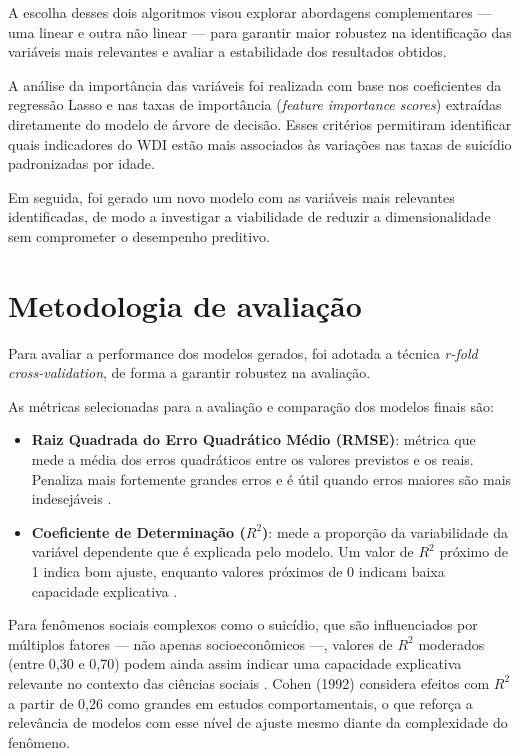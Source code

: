 \documentclass[letterpaper]{article}
\begin{document}
A escolha desses dois algoritmos visou explorar abordagens complementares — uma linear e outra não linear — para garantir maior robustez na identificação das variáveis mais relevantes e avaliar a estabilidade dos resultados obtidos.

A análise da importância das variáveis foi realizada com base nos coeficientes da regressão Lasso e nas taxas de importância (\textit{feature importance scores}) extraídas diretamente do modelo de árvore de decisão. Esses critérios permitiram identificar quais indicadores do WDI estão mais associados às variações nas taxas de suicídio padronizadas por idade.

Em seguida, foi gerado um novo modelo com as variáveis mais relevantes identificadas, de modo a investigar a viabilidade de reduzir a dimensionalidade sem comprometer o desempenho preditivo.

\section{Metodologia de avaliação} %
Para avaliar a performance dos modelos gerados, foi adotada a técnica \textit{r-fold cross-validation}, de forma a garantir robustez na avaliação.

As métricas selecionadas para a avaliação e comparação dos modelos finais são:

\begin{itemize}
    \item \textbf{Raiz Quadrada do Erro Quadrático Médio (RMSE)}: métrica que mede a média dos erros quadráticos entre os valores previstos e os reais. Penaliza mais fortemente grandes erros e é útil quando erros maiores são mais indesejáveis \cite{chai2014rmse}.
    \item \textbf{Coeficiente de Determinação ($R^2$)}: mede a proporção da variabilidade da variável dependente que é explicada pelo modelo. Um valor de $R^2$ próximo de 1 indica bom ajuste, enquanto valores próximos de 0 indicam baixa capacidade explicativa \cite{frost2019r2}.
\end{itemize}

Para fenômenos sociais complexos como o suicídio, que são influenciados por múltiplos fatores — não apenas socioeconômicos —, valores de $R^2$ moderados (entre 0{,}30 e 0{,}70) podem ainda assim indicar uma capacidade explicativa relevante no contexto das ciências sociais \cite{soc_r2_interpretation}. Cohen (1992) considera efeitos com $R^2$ a partir de 0{,}26 como grandes em estudos comportamentais, o que reforça a relevância de modelos com esse nível de ajuste mesmo diante da complexidade do fenômeno.
\end{document}
